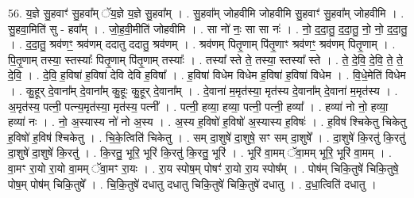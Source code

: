 \documentclass[17pt]{extarticle}
\begin{document}
56. य॒ज्ञे सु॒हवाꣳ॑ सु॒हवा᳚म् ॅय॒ज्ञे य॒ज्ञे सु॒हवा᳚म् । . सु॒हवा᳚म् जोहवीमि जोहवीमि सु॒हवाꣳ॑ सु॒हवा᳚म् जोहवीमि । . सु॒हवा॒मिति॑ सु - हवा᳚म् । . जो॒ह॒वी॒मीति॑ जोहवीमि । . सा नो॑ नः॒ सा सा नः॑ । . नो॒ द॒दा॒तु॒ द॒दा॒तु॒ नो॒ नो॒ द॒दा॒तु॒ । . द॒दा॒तु॒ श्रव॑णꣳ॒॒ श्रव॑णम् ददातु ददातु॒ श्रव॑णम् । . श्रव॑णम् पितृ॒णाम् पि॑तृ॒णाꣳ श्रव॑णꣳ॒॒ श्रव॑णम् पितृ॒णाम् । . पि॒तृ॒णाम् तस्या॒ स्तस्याः᳚ पितृ॒णाम् पि॑तृ॒णाम् तस्याः᳚ । . तस्या᳚ स्ते ते॒ तस्या॒ स्तस्या᳚ स्ते । . ते॒ दे॒वि॒ दे॒वि॒ ते॒ ते॒ दे॒वि॒ । . दे॒वि॒ ह॒विषा॑ ह॒विषा॑ देवि देवि ह॒विषा᳚ । . ह॒विषा॑ विधेम विधेम ह॒विषा॑ ह॒विषा॑ विधेम । . वि॒धे॒मेति॑ विधेम । . कु॒हूर् दे॒वाना᳚म् दे॒वाना᳚म् कु॒हूः कु॒हूर् दे॒वाना᳚म् । . दे॒वाना॑ म॒मृत॑स्या॒ मृत॑स्य दे॒वाना᳚म् दे॒वाना॑ म॒मृत॑स्य । . अ॒मृत॑स्य॒ पत्नी॒ पत्न्य॒मृत॑स्या॒ मृत॑स्य॒ पत्नी᳚ । . पत्नी॒ हव्या॒ हव्या॒ पत्नी॒ पत्नी॒ हव्या᳚ । . हव्या॑ नो नो॒ हव्या॒ हव्या॑ नः । . नो॒ अ॒स्यास्य नो॑ नो अ॒स्य । . अ॒स्य ह॒विषो॑ ह॒विषो॑ अ॒स्यास्य ह॒विषः॑ । . ह॒विष॑ श्चिकेतु चिकेतु ह॒विषो॑ ह॒विष॑ श्चिकेतु । . चि॒के॒त्विति॑ चिकेतु । . सम् दा॒शुषे॑ दा॒शुषे॒ सꣳ सम् दा॒शुषे᳚ । . दा॒शुषे॑ कि॒रतु॑ कि॒रतु॑ दा॒शुषे॑ दा॒शुषे॑ कि॒रतु॑ । . कि॒रतु॒ भूरि॒ भूरि॑ कि॒रतु॑ कि॒रतु॒ भूरि॑ । . भूरि॑ वा॒मम् ॅवा॒मम् भूरि॒ भूरि॑ वा॒मम् । . वा॒मꣳ रा॒यो रा॒यो वा॒मम् ॅवा॒मꣳ रा॒यः । . रा॒य स्पोष॒म् पोषꣳ॑ रा॒यो रा॒य स्पोष᳚म् । . पोष॑म् चिकि॒तुषे॑ चिकि॒तुषे॒ पोष॒म् पोष॑म् चिकि॒तुषे᳚ । . चि॒कि॒तुषे॑ दधातु दधातु चिकि॒तुषे॑ चिकि॒तुषे॑ दधातु । . द॒धा॒त्विति॑ दधातु । \newline
\end{document}
